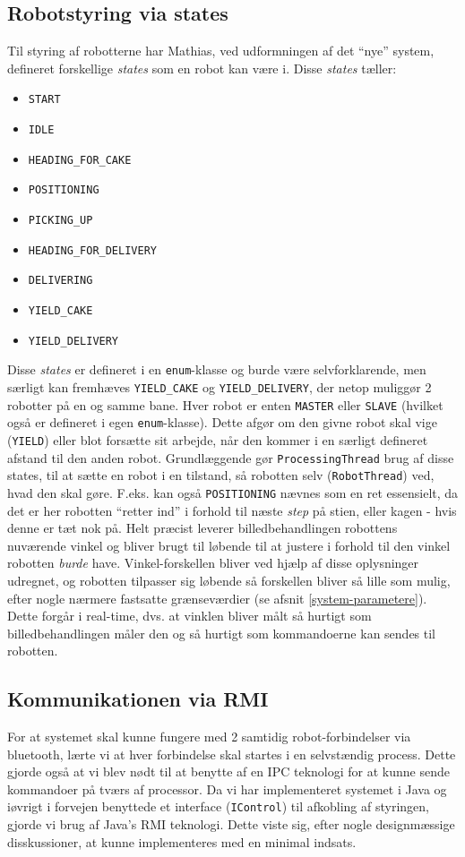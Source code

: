 \subsection{Robotstyring via states}
Til styring af robotterne har Mathias, ved udformningen af det "`nye"' system, defineret forskellige \textit{states} som en robot kan være i. Disse \textit{states} tæller:
\begin{itemize}
\item \texttt{START}
\item \texttt{IDLE}
\item \texttt{HEADING\_FOR\_CAKE}
\item \texttt{POSITIONING}
\item \texttt{PICKING\_UP}
\item \texttt{HEADING\_FOR\_DELIVERY}
\item \texttt{DELIVERING}
\item \texttt{YIELD\_CAKE}
\item \texttt{YIELD\_DELIVERY}
\end{itemize}
Disse \textit{states} er defineret i en \texttt{enum}-klasse og burde være selvforklarende, men særligt kan fremhæves \texttt{YIELD\_CAKE} og \texttt{YIELD\_DELIVERY}, der netop muliggør 2 robotter på en og samme bane. Hver robot er enten \texttt{MASTER} eller \texttt{SLAVE} (hvilket også er defineret i egen \texttt{enum}-klasse). Dette afgør om den givne robot skal vige (\texttt{YIELD}) eller blot forsætte sit arbejde, når den kommer i en særligt defineret afstand til den anden robot. Grundlæggende gør \texttt{ProcessingThread} brug af disse states, til at sætte en robot i en tilstand, så robotten selv (\texttt{RobotThread}) ved, hvad den skal gøre.
F.eks. kan også \texttt{POSITIONING} nævnes som en ret essensielt, da det er her robotten “retter ind” i forhold til næste \textit{step} på stien, eller kagen - hvis denne er tæt nok på. Helt præcist leverer billedbehandlingen robottens nuværende vinkel og bliver brugt til løbende til at justere i forhold til den vinkel robotten \textit{burde} have. Vinkel-forskellen bliver ved hjælp af disse oplysninger udregnet, og robotten tilpasser sig løbende så forskellen bliver så lille som mulig, efter nogle nærmere fastsatte grænseværdier (se afsnit  \vref{system-parametere}). Dette forgår i real-time, dvs. at vinklen bliver målt så hurtigt som billedbehandlingen måler den og så hurtigt som kommandoerne kan sendes til robotten.

\subsection{Kommunikationen via RMI}
For at systemet skal kunne fungere med 2 samtidig robot-forbindelser via bluetooth, lærte vi at hver forbindelse skal startes i en selvstændig process. Dette gjorde også at vi blev nødt til at benytte af en IPC teknologi for at kunne sende kommandoer på tværs af processor.
Da vi har implementeret systemet i Java og iøvrigt i forvejen benyttede et interface (\texttt{IControl}) til afkobling af styringen, gjorde vi brug af Java’s RMI teknologi. Dette viste sig, efter nogle designmæssige disskussioner, at kunne implementeres med en minimal indsats.

